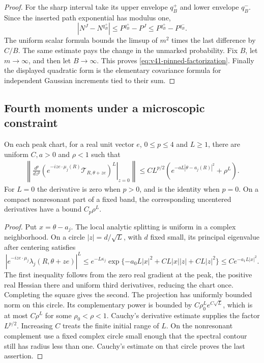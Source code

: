 \begin{proof}
For the sharp interval take its upper envelope $q_B^+$ and lower
envelope $q_B^-$. Since the inserted path exponential has modulus one,
\[
 |N^J-N^{q_B^+}|\le P^{q_B^+}-P^J
                         \le P^{q_B^+}-P^{q_B^-}.
\]
The uniform scalar formula bounds the limsup of $m^2$ times the last
difference by $C/B$. The same estimate pays the change in the unmarked
probability. Fix $B$, let $m\to\infty$, and then let $B\to\infty$.
This proves \eqref{eq:v41-pinned-factorization}. Finally the displayed
quadratic form is the elementary covariance formula for independent
Gaussian increments tied to their sum.
\end{proof}

\subsection{Fourth moments under a microscopic constraint}
\begin{lemma}
\label{lem:v41-peak-derivatives}
On each peak chart, for a real unit vector $e$, $0\le p\le4$ and
$L\ge1$, there are uniform $C,a>0$ and $\rho<1$ such that
\begin{align}
 \left\|\left.\frac{d^p}{dz^p}
    \left(e^{-iz e\cdot\mu_j(R)}
                  \mathscr T_{R,\theta+ze}\right)^L
                         \right|_{z=0}\right\|
 \le C L^{p/2}\left(e^{-aL|\theta-a_j(R)|^2}+\rho^L\right).
                                      \label{eq:v41-peak-derivatives}
\end{align}
For $L=0$ the derivative is zero when $p>0$, and is the identity when
$p=0$. On a compact nonresonant part of a fixed band, the corresponding
uncentered derivatives have a bound $C_p\rho^L$.
\end{lemma}
\begin{proof}
Put $x=\theta-a_j$. The local analytic splitting is uniform in a
complex neighborhood. On a circle $|z|=d/\sqrt L$, with $d$ fixed
small, its principal eigenvalue after centering satisfies
\[
 \left|e^{-iz e\cdot\mu_j}\lambda_j(R,\theta+ze)\right|^L
  \le e^{-L\kappa_j}
       \exp\{-a_0L|x|^2+C L|x||z|+C L|z|^2\}
  \le C e^{-a_1L|x|^2}.
\]
The first inequality follows from the zero real gradient at the peak,
the positive real Hessian there and uniform third derivatives, reducing
the chart once. Completing the square gives the second. The projection
has uniformly bounded norm on this circle. Its complementary power is
bounded by $C\rho_0^L e^{C\sqrt L}$, which is at most $C\rho^L$ for
some $\rho_0<\rho<1$. Cauchy's derivative estimate supplies the factor
$L^{p/2}$. Increasing $C$ treats the finite initial range of $L$.
On the nonresonant complement use a fixed complex circle small enough
that the spectral contour still has radius less than one. Cauchy's
estimate on that circle proves the last assertion.
\end{proof}

